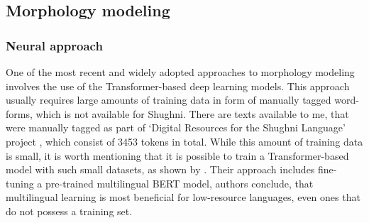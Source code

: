 \subsection{Morphology modeling}
\subsubsection{Neural approach}
\par One of the most recent and widely adopted approaches to morphology modeling involves the use of the Transformer-based deep learning models. This approach usually requires large amounts of training data in form of manually tagged word-forms, which is not available for Shughni. There are texts available to me, that were manually tagged as part of `Digital Resources for the Shughni Language' project \parencite{makarov_digital_2022}, which consist of 3453 tokens in total. While this amount of training data is small, it is worth mentioning that it is possible to train a Transformer-based model with such small datasets, as shown by \cite{kondratyuk_straka_model_2019}. Their approach includes fine-tuning a pre-trained multilingual BERT model, authors conclude, that multilingual learning is most beneficial for low-resource languages, even ones that do not possess a training set. 

